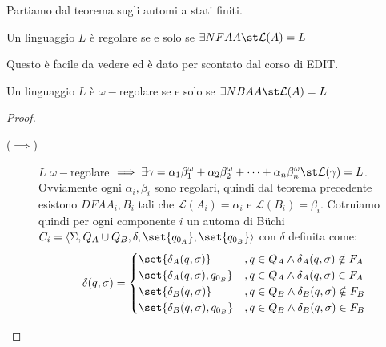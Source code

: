 Partiamo dal teorema sugli automi a stati finiti.

\begin{theorem}
  Un linguaggio \(L\) è regolare se e solo se \(\exists NFA A \st \mathcal{L}(A) = L\)
\end{theorem}

Questo è facile da vedere ed è dato per scontato dal corso di EDIT.

\begin{theorem}
  Un linguaggio \(L\) è \(\omega-\)regolare se e solo se \(\exists NBA A \st \mathcal{L}(A) = L\)
\end{theorem}

\begin{proof}
  \begin{description}
    \item[(\(\implies\))] \(L\) \(\omega-\)regolare \(\implies \exists \gamma = \alpha_1\beta_1^\omega+\alpha_2\beta_2^\omega+\cdots + \alpha_n\beta_n^\omega \st \mathcal{L}(\gamma) = L\). Ovviamente ogni \(\alpha_i,\beta_i\) sono regolari, quindi dal teorema precedente esistono \(DFA A_{i}, B_{i}\) tali che \(\mathcal{L}(A_i) = \alpha_i\) e \(\mathcal{L}(B_i) = \beta_i\).
      Cotruiamo quindi per ogni componente \(i\) un automa di Büchi \(C_i= \langle \Sigma, Q_A \cup Q_B, \delta, \set{q_{0_A}}, \set{q_{0_B}}\rangle\) con \(\delta\) definita come:
      \[\delta(q,\sigma)=\begin{cases}
          \set{\delta_A(q,\sigma)}          & ,q \in Q_A \land \delta_A(q,\sigma)\notin F_A \\
          \set{\delta_A(q,\sigma), q_{0_B}} & ,q \in Q_A \land \delta_A(q,\sigma)\in F_A    \\
          \set{\delta_B(q,\sigma)}          & ,q \in Q_B \land \delta_B(q,\sigma)\notin F_B \\
          \set{\delta_B(q,\sigma), q_{0_B}} & ,q \in Q_B \land \delta_B(q,\sigma)\in F_B    \\
        \end{cases}\]


\end{description}
\end{proof}
